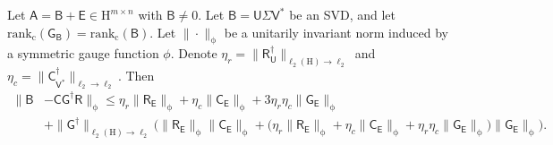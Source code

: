 \documentclass[onefignum,onetabnum]{siamart250211}
\newcommand{\Hilb}{\mathrm{H}}
\newcommand{\Batrix}[1]{\bm{\Matrix{#1}}}
\newcommand{\Matrix}[1]{\mathsf{#1}}
\newcommand{\pinv}{\dagger}
\newcommand{\Rank}[3][]{\mathrm{rank_{#2}} #1( #3 #1)}
\newcommand{\Norm}[3][]{#1\| #2 #1\|_{\mathrm{#3}}}
\begin{document}
\begin{theorem}
\label{theorem:cgr_error}
Let $\Batrix{A} = \Batrix{B} + \Batrix{E} \in \Hilb^{m \times n}$ with $\Batrix{B} \neq 0$.
Let $\Batrix{B} = \Batrix{U} \Matrix{\Sigma} \Matrix{V}^\ast$ be an SVD, and let $\Rank{c}{\Batrix{G}_{\Batrix{B}}} = \Rank{c}{\Batrix{B}}$.
Let $\Norm{\cdot}{\phi}$ be a unitarily invariant norm induced by a symmetric gauge function $\phi$.
Denote $\eta_r = \Norm{\Batrix{R}_{\Batrix{U}}^\pinv}{\ell_2(\Hilb) \to \ell_2}$ and $\eta_c = \Norm{\Matrix{C}_{\Matrix{V}^\ast}^\pinv}{\ell_2 \to \ell_2}$.
Then
\begin{align*}
    \Norm{\Batrix{B} &- \Batrix{C} \Batrix{G}^\pinv \Batrix{R}}{\phi} \leq \eta_r \Norm{\Batrix{R}_{\Batrix{E}}}{\phi} + \eta_c \Norm{\Batrix{C}_{\Batrix{E}}}{\phi} + 3 \eta_r \eta_c \Norm{\Batrix{G}_{\Batrix{E}}}{\phi} \\
    &+ \Norm{\Batrix{G}^\pinv}{\ell_2(\Hilb) \to \ell_2} \Big( \Norm{\Batrix{R}_{\Batrix{E}}}{\phi} \Norm{\Batrix{C}_{\Batrix{E}}}{\phi} + \big(\eta_r \Norm{\Batrix{R}_{\Batrix{E}}}{\phi} + \eta_c \Norm{\Batrix{C}_{\Batrix{E}}}{\phi} + \eta_r \eta_c \Norm{\Batrix{G}_{\Batrix{E}}}{\phi}\big) \Norm{\Batrix{G}_{\Batrix{E}}}{\phi} \Big).
\end{align*}
\end{theorem}
\end{document}
